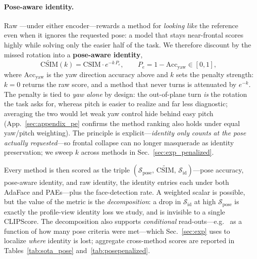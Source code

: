 \paragraph{Pose-aware identity.} Raw \csim{}---under either encoder---rewards
a method for \emph{looking like} the reference even when it ignores the
requested pose: a model that stays near-frontal scores highly while solving
only the easier half of the task. We therefore discount \csim{} by the missed
rotation into a \textbf{pose-aware identity},
\begin{equation}
\widetilde{\mathrm{CSIM}}(k)=\mathrm{CSIM}\cdot e^{-k\,P_e},\qquad
P_e=1-\mathrm{Acc_{yaw}}\in[0,1],
\label{eq:posepenalty}
\end{equation}
where $\mathrm{Acc_{yaw}}$ is the yaw direction accuracy above and $k$ sets
the penalty strength: $k{=}0$ returns the raw score, and a method that never
turns is attenuated by $e^{-k}$. The penalty is tied to \emph{yaw alone} by
design: the out-of-plane turn \emph{is} the rotation the task asks for,
whereas pitch is easier to realize and far less diagnostic; averaging the two
would let weak yaw control hide behind easy pitch
(App.~\ref{sec:appendix_pe} confirms the method ranking also holds under equal
yaw/pitch weighting). The principle is explicit---\emph{identity only counts
at the pose actually requested}---so frontal collapse can no longer masquerade
as identity preservation; we sweep $k$ across methods in
Sec.~\ref{sec:exp_penalized}. 

Every method is then scored as the triple
$(\mathcal{S}_{\mathrm{pose}},\,\widetilde{\mathrm{CSIM}},\,
\mathcal{S}_{\mathrm{id}})$---pose accuracy, pose-aware identity, and raw
identity, the identity entries each under both AdaFace and PAEs---plus the
face-detection rate. A weighted scalar is possible, but the value of the
metric is the \emph{decomposition}: a drop in $\mathcal{S}_{\mathrm{id}}$ at
high $\mathcal{S}_{\mathrm{pose}}$ is exactly the profile-view identity loss
we study, and is invisible to a single CLIPScore. The decomposition also
supports \emph{conditional} read-outs---e.g.\ \csim{} as a function of how
many pose criteria were met---which Sec.~\ref{sec:exp} uses to localize
\emph{where} identity is lost; aggregate cross-method scores are reported in
Tables~\ref{tab:sota_pose} and~\ref{tab:posepenalized}.
